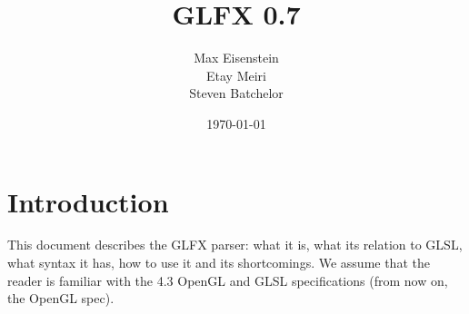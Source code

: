 \documentclass[11pt,a4paper,final,titlepage]{article}
\begin{document}
\title{GLFX 0.7}
\author{Max Eisenstein\\Etay Meiri\\Steven Batchelor}
\date{\today}
\maketitle

\listoffixmes

\tableofcontents

\pagebreak

\section{Introduction}\label{sec:intro}
This document describes the GLFX parser: what it is, what its relation to GLSL,
what syntax it has, how to use it and its shortcomings. We assume that the reader is familiar with the
4.3 OpenGL and GLSL specifications (from now on, the OpenGL spec).
\end{document}
